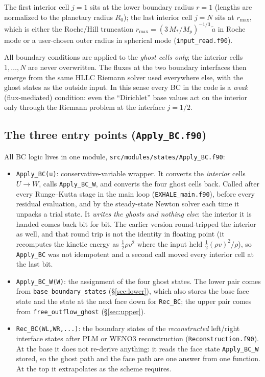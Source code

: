 \documentclass[english,a4paper]{my_memo}
\begin{document}
The first interior cell $j=1$ sits at the lower boundary radius
$r = 1$ (lengths are normalized to the planetary radius $R_0$); the
last interior cell $j=N$ sits at $r_{\max}$, which is either the
Roche/Hill truncation $r_{\max} = (3\,M_*/M_p)^{-1/3}\,\tilde a$ in
Roche mode or a user-chosen outer radius in spherical mode
(\texttt{input\_read.f90}).

All boundary conditions are applied to the \emph{ghost cells only};
the interior cells $1,\dots,N$ are never overwritten. The fluxes at
the two boundary interfaces then emerge from the same HLLC Riemann
solver used everywhere else, with the ghost states as the outside
input. In this sense every BC in the code is a \emph{weak} (flux-mediated)
condition: even the ``Dirichlet'' base values act on the interior only
through the Riemann problem at the interface $j = 1/2$.

\subsection{The three entry points (\texttt{Apply\_BC.f90})}

All BC logic lives in one module,
\texttt{src/modules/states/Apply\_BC.f90}:

\begin{itemize}
\item \texttt{Apply\_BC(u)}: conservative-variable wrapper. It converts the
  \emph{interior} cells $U \to W$, calls \texttt{Apply\_BC\_W}, and
  converts the four ghost cells back. Called after every Runge--Kutta stage
  in the main loop (\texttt{EXHALE\_main.f90}), before every residual
  evaluation, and by the steady-state Newton solver each time it unpacks a
  trial state. It \emph{writes the ghosts and nothing else}: the interior it
  is handed comes back bit for bit. The earlier version round-tripped the
  interior as well, and that round trip is not the identity in floating
  point (it recomputes the kinetic energy as $\tfrac12\rho v^2$ where the
  input held $\tfrac12 (\rho v)^2/\rho$), so \texttt{Apply\_BC} was not
  idempotent and a second call moved every interior cell at the last bit.
\item \texttt{Apply\_BC\_W(W)}: the assignment of the four ghost states.
  The lower pair comes from \texttt{base\_boundary\_states}
  (\S\ref{sec:lower}), which also stores the base face state and the state
  at the next face down for \texttt{Rec\_BC}; the upper pair comes from
  \texttt{free\_outflow\_ghost} (\S\ref{sec:upper}).
\item \texttt{Rec\_BC(WL,WR,...)}: the boundary states of the
  \emph{reconstructed} left/right interface states after PLM or WENO3
  reconstruction (\texttt{Reconstruction.f90}). At the base it does not
  re-derive anything: it reads the face state \texttt{Apply\_BC\_W} stored,
  so the ghost path and the face path are one answer from one function. At
  the top it extrapolates as the scheme requires.
\end{itemize}
\end{document}
